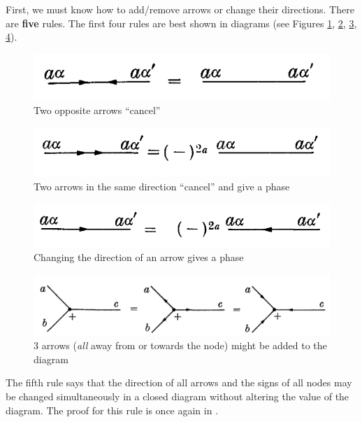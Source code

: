 \documentclass[11pt]{article}
\begin{document}
\begin{appendices}
First, we must know how to add/remove arrows or change their directions. There are \textbf{five} rules. The first four rules are best shown in diagrams (see Figures \ref{fig:arrow1}, \ref{fig:arrow2}, \ref{fig:arrow3}, \ref{fig:arrow4}). 
	\begin{figure}[!htb]
		\centering
		\includegraphics[scale=0.7]{arrow_1}
		\caption{Two opposite arrows ``cancel'' \cite{angular_momentum}}
		\label{fig:arrow1}
	\end{figure}	
	\begin{figure}[!htb]
		\centering
		\includegraphics[scale=0.7]{arrow_2}
		\caption{Two arrows in the same direction  ``cancel'' and give a phase  \cite{angular_momentum}}
		\label{fig:arrow2}
	\end{figure}
	\begin{figure}[!htb]
		\centering
		\includegraphics[scale=0.7]{arrow_3}
		\caption{Changing the direction of an arrow gives a phase \cite{angular_momentum}}
		\label{fig:arrow3}
	\end{figure}
	\begin{figure}[!htb]
		\centering
		\includegraphics[scale=0.7]{arrow_4}
		\caption{3 arrows (\textit{all} away from or towards the node) might be added to the diagram  \cite{angular_momentum}}
		\label{fig:arrow4}
	\end{figure}
The fifth rule says that the direction of all arrows and the signs of all nodes may be changed simultaneously in a closed diagram without altering the value of the diagram. The proof for this rule is once again in \cite{angular_momentum}. 


\end{appendices}
\end{document}
